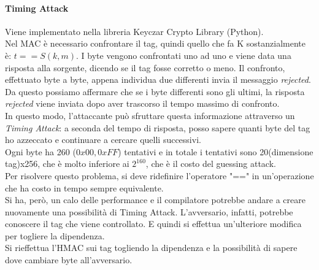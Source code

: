 \documentclass[a4paper,12pt]{article}
\begin{document}
\paragraph{Timing Attack} Viene implementato nella libreria Keyczar Crypto Library (Python). \\
Nel MAC è necessario confrontare il tag, quindi quello che fa K sostanzialmente è: $t == S(k,m)$. 
I byte vengono confrontati uno ad uno e viene data una risposta alla sorgente, dicendo se il tag fosse corretto o meno. 
Il confronto, effettuato byte a byte, appena individua due differenti invia il messaggio \textit{rejected}. Da questo possiamo affermare che se i byte differenti sono gli ultimi, la risposta \textit{rejected} viene inviata dopo aver trascorso il tempo massimo di confronto. \\
In questo modo, l'attaccante può sfruttare questa informazione attraverso un \textit{Timing Attack}: 
a seconda del tempo di risposta, posso sapere quanti byte del tag ho azzeccato e continuare a cercare quelli successivi. \\
Ogni byte ha 260 ($0x00, 0xFF$) tentativi e in totale i tentativi sono 20(dimensione tag)x256, che è molto inferiore ai $2^{160}$, che è il costo del guessing attack. \\
Per risolvere questo problema, si deve ridefinire l'operatore "==" in un'operazione che ha costo in tempo sempre equivalente. \\
Si ha, però, un calo delle performance e il compilatore potrebbe andare a creare nuovamente una possibilità di Timing Attack. L'avversario, infatti, potrebbe conoscere il tag che viene controllato. E quindi si effettua un'ulteriore modifica per togliere la dipendenza. \\
Si rieffettua l'HMAC sui tag togliendo la dipendenza e la possibilità di sapere dove cambiare byte all'avversario.
\end{document}
